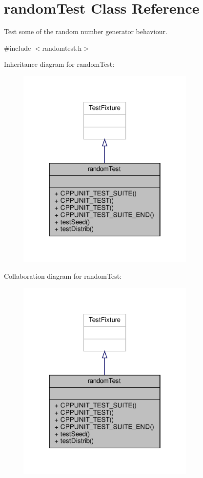 \hypertarget{classrandomTest}{}\section{random\+Test Class Reference}
\label{classrandomTest}


Test some of the random number generator behaviour.  




{\ttfamily \#include $<$randomtest.\+h$>$}



Inheritance diagram for random\+Test\+:\nopagebreak
\begin{figure}[H]
\begin{center}
\leavevmode
\includegraphics[width=250pt]{classrandomTest__inherit__graph}
\end{center}
\end{figure}


Collaboration diagram for random\+Test\+:\nopagebreak
\begin{figure}[H]
\begin{center}
\leavevmode
\includegraphics[width=250pt]{classrandomTest__coll__graph}
\end{center}
\end{figure}

